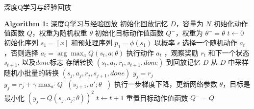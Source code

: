 \documentclass{article}
\begin{document}
\begin{algorithm}
\caption{深度Q学习与经验回放}
\label{alg:deep-q-learning}
\begin{algorithmic}
\State \textbf{Algorithm 1:} 深度Q学习与经验回放
\State 初始化回放记忆 $D$，容量为 $N$
\State 初始化动作值函数 $Q$，权重为随机权重 $\theta$
\State 初始化目标动作值函数 $Q^-$，权重为 $\theta^- = \theta$
\State $t \gets 0$
    \State 初始化序列 $s_1 = [x]$ 和预处理序列 $p_1 = \phi(s_1)$
        \State 以概率 $\epsilon$ 选择一个随机动作 $a_t$，否则选择 $a_t = \arg\max_{a} Q(s_t, a; \theta)$
        \State 执行动作 $a_t$ ，观察奖励 $r_t$ 和下一个状态 $s_{t+1}$, 以及$done$标志
        \State 存储转换 $(s_t, a_t, r_t, s_{t+1},done)$ 到回放记忆 $D$
        \State 从 $D$ 中采样随机小批量的转换 $(s_j, a_j, r_j, s_{j+1}, done)$
            \State $y_j = r_j$
        \Else
            \State $y_j = r_j + \gamma \max_{a'} Q^-(s_{j+1}, a'; \theta^-)$
        \EndIf
        \State 执行一步梯度下降，更新网络参数 $\theta$，目标是最小化 $(y_j - Q(s_j, a_j; \theta))^2$
        \State $t \gets t + 1$
            \State 重置目标动作值函数 $Q^- = Q$
        \EndIf
    \EndFor
\EndFor
\end{algorithmic}
\end{algorithm}
\end{document}

